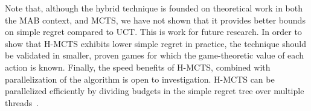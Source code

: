 \documentclass{kecsmstr}
\begin{document}
Note that, although the hybrid technique is founded on theoretical work in both the MAB context, and MCTS, we have not shown that it provides better bounds on simple regret compared to UCT. This is work for future research. In order to show that H-MCTS exhibits lower simple regret in practice, the technique should be validated in smaller, proven games for which the game-theoretic value of each action is known. Finally, the speed benefits of H-MCTS, combined with parallelization of the algorithm is open to investigation. H-MCTS can be parallelized efficiently by dividing budgets in the simple regret tree over multiple threads~.

 \emptypage

\appendix



\end{document}
